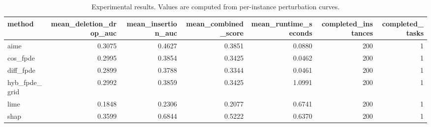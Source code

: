 \begin{table}[t]
\caption{Experimental results. Values are computed from per-instance perturbation curves.}
\label{tab:main_results_computed}
\centering
\begin{tabular}{lrrrrrr}
\toprule
method & mean\_deletion\_drop\_auc & mean\_insertion\_auc & mean\_combined\_score & mean\_runtime\_seconds & completed\_instances & completed\_tasks \\
\midrule
aime & 0.3075 & 0.4627 & 0.3851 & 0.0880 & 200 & 1 \\
cos\_fpde & 0.2995 & 0.3854 & 0.3425 & 0.0462 & 200 & 1 \\
diff\_fpde & 0.2899 & 0.3788 & 0.3344 & 0.0461 & 200 & 1 \\
hyb\_fpde\_grid & 0.2992 & 0.3859 & 0.3425 & 1.0991 & 200 & 1 \\
lime & 0.1848 & 0.2306 & 0.2077 & 0.6741 & 200 & 1 \\
shap & 0.3599 & 0.6844 & 0.5222 & 0.6370 & 200 & 1 \\
\bottomrule
\end{tabular}

\end{table}
